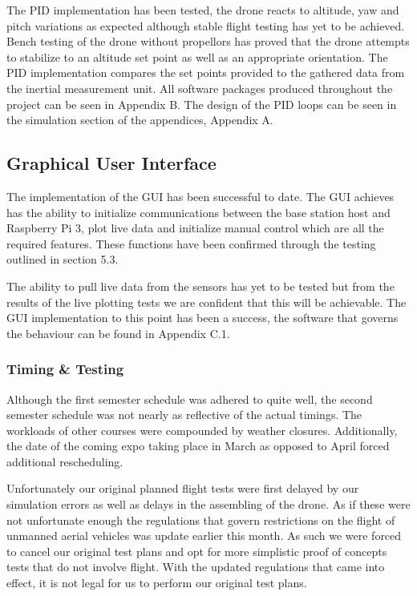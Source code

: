 The PID implementation has been tested, the drone reacts to altitude, yaw and pitch variations as expected although stable flight testing has yet to be achieved. Bench testing of the drone without propellors has proved that the drone attempts to stabilize to an altitude set point as well as an appropriate orientation. The PID implementation compares the set points provided to the gathered data from the inertial measurement unit. All software packages produced throughout the project can be seen in Appendix B. The design of the PID loops can be seen in the simulation section of the appendices, Appendix A.

\subsection{Graphical User Interface}
The implementation of the GUI has been successful to date. The GUI achieves has the ability to initialize communications between the base station host and Raspberry Pi 3, plot live data and initialize manual control which are all the required features. These functions have been confirmed through the testing outlined in section 5.3.

The ability to pull live data from the sensors has yet to be tested but from the results of the live plotting tests we are confident that this will be achievable. The GUI implementation to this point has been a success, the software that governs the behaviour can be found in Appendix C.1.

\subsubsection{Timing \& Testing}
Although the first semester schedule was adhered to quite well, the second semester schedule was not nearly as reflective of the actual timings.  The workloads of other courses were compounded by weather closures.  Additionally, the date of the coming expo taking place in March as opposed to April forced additional rescheduling.

Unfortunately our original planned flight tests were first delayed by our simulation errors as well as delays in the assembling of the drone.  As if these were not unfortunate enough the regulations that govern restrictions on the flight of unmanned aerial vehicles was update earlier this month.  As such we were forced to cancel our original test plans and opt for more simplistic proof of concepts tests that do not involve flight.  With the updated regulations that came into effect, it is not legal for us to perform our original test plans.


